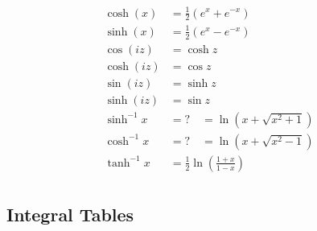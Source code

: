 \begin{align*}
\cosh(x)    &= \frac{1}{2}(e^x + e^{-x}) \\
\sinh(x)    &= \frac{1}{2}(e^x - e^{-x}) \\
\cos(iz)    &= \cosh z \\
\cosh(iz)   &= \cos z \\
\sin(iz)    &= \sinh z \\
\sinh(iz)   &= \sin z \\
\sinh^{-1}x &= ? \quad = \ln(x + \sqrt{x^2+1}) \\
\cosh^{-1}x &= ? \quad = \ln(x + \sqrt{x^2-1}) \\
\tanh^{-1}x &= \frac{1}{2}\ln(\frac{1+x}{1-x}) \\
\end{align*}

\hypertarget{integral-tables}{%
\subsection{Integral Tables}\label{integral-tables}}

